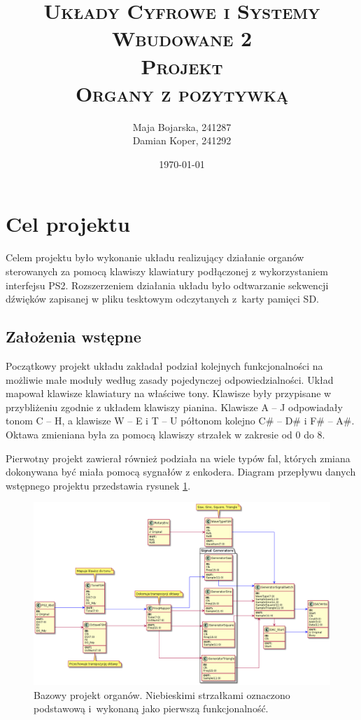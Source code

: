 \documentclass[12pt]{article}
\title{ 
    \vspace*{50mm}
    \textsc{
        \textbf{Układy Cyfrowe i Systemy Wbudowane 2}\\
        \large Projekt \\
         Organy z pozytywką
    }
}
\author{
Maja Bojarska, 241287\\
Damian Koper,  241292\\
}
\date{\today}
\begin{document}
\maketitle

\newpage

\section{Cel projektu}

Celem projektu było wykonanie układu realizujący działanie organów sterowanych za pomocą klawiszy klawiatury podłączonej z wykorzystaniem interfejsu PS2. Rozszerzeniem działania układu było odtwarzanie sekwencji dźwięków zapisanej w pliku tesktowym odczytanych z~karty pamięci SD.

\subsection{Założenia wstępne}

Początkowy projekt układu zakładał podział kolejnych funkcjonalności na możliwie małe moduły według zasady pojedynczej odpowiedzialności. Układ mapował klawisze klawiatury na właściwe tony. Klawisze były przypisane w przybliżeniu zgodnie z układem klawiszy pianina.  Klawisze A -- J odpowiadały tonom C -- H, a klawisze W -- E i T -- U półtonom kolejno C\# -- D\# i F\# -- A\#. Oktawa zmieniana była za pomocą klawiszy strzałek w zakresie od 0 do 8.

Pierwotny projekt zawierał również podziała na wiele typów fal, których zmiana dokonywana być miała pomocą sygnałów z enkodera. Diagram przepływu danych wstępnego projektu przedstawia rysunek \ref{base}.

\begin{figure}[H]
  \centering
  \includegraphics[width=\linewidth]{./diagram/out/flow_chart}
  \caption{Bazowy projekt organów. Niebieskimi strzałkami oznaczono podstawową i~wykonaną jako pierwszą funkcjonalność. }
  \label{base}
\end{figure}
\end{document}

